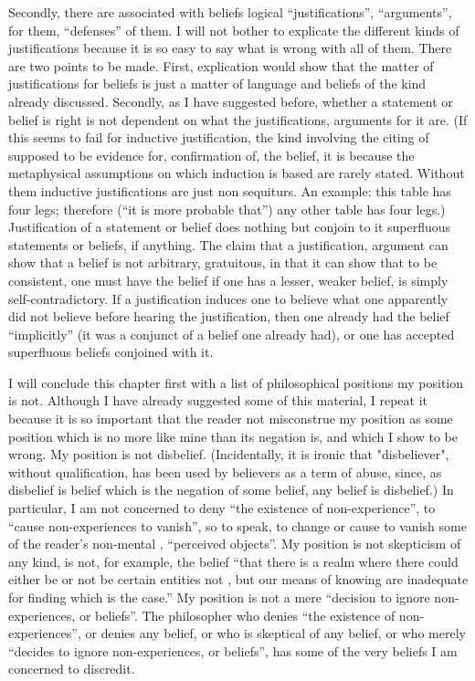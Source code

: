 Secondly, there are associated with beliefs logical \enquote{justifications}, 
\enquote{arguments}, for them, \enquote{defenses} of them. I will not bother to explicate 
the different kinds of justifications because it is so easy to say what is wrong 
with all of them. There are two points to be made. First, explication would 
show that the matter of justifications for beliefs is just a matter of language 
and beliefs of the kind already discussed. Secondly, as I have suggested 
before, whether a statement or belief is right is not dependent on what the 
justifications, arguments for it are. (If this seems to fail for inductive 
justification, the kind involving the citing of  supposed to be 
evidence for, confirmation of, the belief, it is because the metaphysical 
assumptions on which induction is based are rarely stated. Without them 
inductive justifications are just non sequiturs. An example: this table has 
four legs; therefore (\enquote{it is more probable that}) any other table has four 
legs.) Justification of a statement or belief does nothing but conjoin to it 
superfluous statements or beliefs, if anything. The claim that a justification, 
argument can show that a belief is not arbitrary, gratuitous, in that it can 
show that to be consistent, one must have the belief if one has a lesser, 
weaker belief, is simply self-contradictory. If a justification induces one to 
believe what one apparently did not believe before hearing the justification, 
then one already had the belief \enquote{implicitly} (it was a conjunct of a belief 
one already had), or one has accepted superfluous beliefs conjoined with it. 

I will conclude this chapter first with a list of philosophical positions 
my position is not. Although I have already suggested some of this material, 
I repeat it because it is so important that the reader not misconstrue my 
position as some position which is no more like mine than its negation is, 
and which I show to be wrong. My position is not disbelief. (Incidentally, it 
is ironic that "disbeliever", without qualification, has been used by believers 
as a term of abuse, since, as disbelief is belief which is the negation of some 
belief, any belief is disbelief.) In particular, I am not concerned to deny \enquote{the 
existence of non-experience}, to \enquote{cause non-experiences to vanish}, so to 
speak, to change or cause to vanish some of the reader's non-mental 
, \enquote{perceived objects}. My position is not skepticism of any kind, 
is not, for example, the belief \enquote{that there is a realm where there could either 
be or not be certain entities not , but our means of knowing are 
inadequate for finding which is the case.} My position is not a mere 
\enquote{decision to ignore non-experiences, or beliefs}. The philosopher who denies 
\enquote{the existence of non-experiences}, or denies any belief, or who is skeptical 
of any belief, or who merely \enquote{decides to ignore non-experiences, or beliefs}, 
has some of the very beliefs I am concerned to discredit. 

